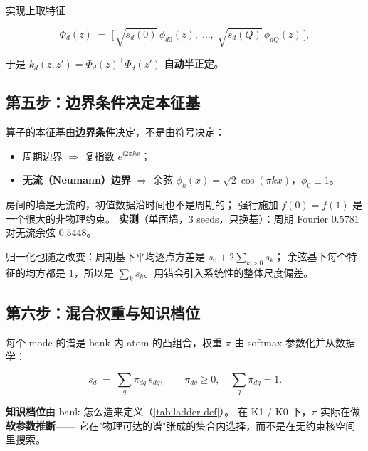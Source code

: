 \documentclass[11pt,a4paper]{article}
\begin{document}
实现上取特征

\begin{equation}
\Phi_d(z) \;=\; \bigl[\, \sqrt{s_d(0)}\,\phi_{d0}(z), \; \ldots, \;
                        \sqrt{s_d(Q)}\,\phi_{dQ}(z) \,\bigr],
\end{equation}

于是 $k_d(z,z') = \Phi_d(z)^\top \Phi_d(z')$ \textbf{自动半正定}。

\subsection{第五步：边界条件决定本征基}

算子的本征基由\textbf{边界条件}决定，不是由符号决定：

\begin{itemize}[nosep,leftmargin=1.6em]
  \item 周期边界 $\Rightarrow$ 复指数 $e^{i 2\pi k x}$；
  \item \textbf{无流（Neumann）边界} $\Rightarrow$ 余弦
        $\phi_k(x) = \sqrt{2}\cos(\pi k x)$，$\phi_0 \equiv 1$。
\end{itemize}

房间的墙是无流的，初值数据沿时间也不是周期的；
强行施加 $f(0) = f(1)$ 是一个很大的非物理约束。
\textbf{实测}（单面墙，$3$ seeds，只换基）：周期 Fourier $0.5781$ 对无流余弦 $0.5448$。

归一化也随之改变：周期基下平均逐点方差是 $s_0 + 2\sum_{k>0} s_k$；
余弦基下每个特征的均方都是 $1$，所以是 $\sum_k s_k$。用错会引入系统性的整体尺度偏差。

\subsection{第六步：混合权重与知识档位}

每个 mode 的谱是 bank 内 atom 的凸组合，权重 $\pi$ 由 softmax 参数化并从数据学：

\begin{equation}
s_d \;=\; \sum_{q} \pi_{dq} \, s_{dq}, \qquad
\pi_{dq} \ge 0, \quad \textstyle\sum_q \pi_{dq} = 1 .
\end{equation}

\textbf{知识档位}由 bank 怎么造来定义（\cref{tab:ladder-def}）。
在 K1 / K0 下，$\pi$ 实际在做\textbf{软参数推断}——
它在"物理可达的谱"张成的集合内选择，而不是在无约束核空间里搜索。
\end{document}
